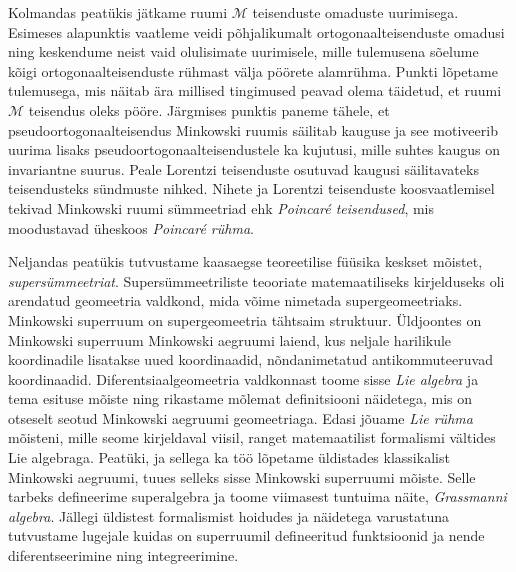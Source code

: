 \documentclass[12pt,a4paper,oneside]{article}
\theoremstyle{plain}
\theoremstyle{definition}
\numberwithin{equation}{section}
\def\M{{\mathcal M}}
\begin{document}
Kolmandas peatükis jätkame ruumi $\M$ teisenduste omaduste 
uurimisega. Esimeses alapunktis vaatleme veidi 
põhjalikumalt ortogonaalteisenduste omadusi ning 
keskendume neist vaid olulisimate uurimisele, mille 
tulemusena sõelume kõigi ortogonaalteisenduste rühmast välja 
pöörete alamrühma. Punkti lõpetame tulemusega, mis näitab 
ära millised tingimused peavad olema täidetud, et ruumi 
$\M$ teisendus oleks pööre. Järgmises punktis paneme tähele, 
et pseudoortogonaalteisendus Minkowski ruumis 
säilitab kauguse ja see motiveerib uurima lisaks 
pseudoortogonaalteisendustele ka kujutusi, mille suhtes kaugus 
on invariantne suurus. Peale Lorentzi teisenduste osutuvad 
kaugusi säilitavateks teisendusteks sündmuste nihked. Nihete 
ja Lorentzi teisenduste koosvaatlemisel tekivad Minkowski 
ruumi sümmeetriad ehk \emph{Poincar\'e teisendused}, mis 
moodustavad üheskoos \emph{Poincar\'e rühma}.

\begin{comment}
Parem oleks kirjutada, et kaasaegses teoreetilises füüsikas üheks 
väga tähtsaks mõisteks on supersümmeetria. Supersümmeetriliste 
teooriate matemaatiliseks kirjelduseks oli arendatud geomeetria 
valdkond, mida võime nimetada supergeomeetriaks. Minkowski 
superruum on supergeomeetria tähtsaim struktuur. Üldjoontes 
Minkowski superruum on Minkowski ruumi laiend, kus neljale 
harilikule koordinadile lisatakse uued koordinaadid nn 
antikommuteeruvad koordinaadid.
\end{comment}

Neljandas peatükis tutvustame kaasaegse teoreetilise füüsika 
keskset mõistet, \emph{supersümmeetriat}. 
Supersümmeetriliste teooriate matemaatiliseks kirjelduseks 
oli arendatud geomeetria valdkond, mida võime nimetada 
supergeomeetriaks. Minkowski superruum on supergeomeetria tähtsaim 
struktuur. Üldjoontes on Minkowski superruum Minkowski aegruumi 
laiend, kus neljale harilikule koordinadile lisatakse uued 
koordinaadid, nõndanimetatud antikommuteeruvad koordinaadid.
Diferentsiaalgeomeetria valdkonnast toome sisse \emph{Lie algebra} 
ja tema esituse mõiste ning rikastame mõlemat definitsiooni 
näidetega, mis on otseselt seotud Minkowski aegruumi geomeetriaga. 
Edasi jõuame \emph{Lie rühma} mõisteni, mille seome 
kirjeldaval viisil, ranget matemaatilist formalismi vältides 
Lie algebraga. Peatüki, ja sellega ka töö lõpetame üldistades 
klassikalist Minkowski aegruumi, tuues selleks sisse Minkowski 
superruumi mõiste. Selle tarbeks defineerime superalgebra ja toome 
viimasest tuntuima näite, \emph{Grassmanni algebra}. Jällegi 
üldistest formalismist hoidudes ja näidetega varustatuna 
tutvustame lugejale kuidas on superruumil defineeritud 
funktsioonid ja nende diferentseerimine ning integreerimine.
\end{document}
